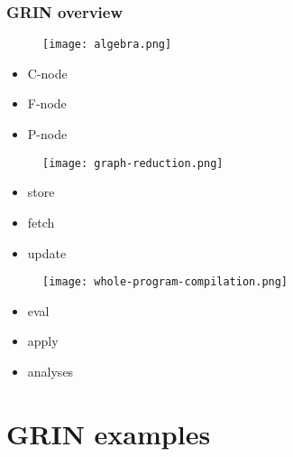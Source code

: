 \documentclass[bigger,aspectratio=169]{beamer}
\begin{document}
\begin{frame}[fragile]
\frametitle{GRIN overview}
\begin{center}

	\begin{minipage}{0.30\textwidth}
		\vspace{1cm}
		\begin{figure}
			\texttt{[image: algebra.png]}
		\end{figure}
		\vspace{0.3cm}
		\begin{itemize}
			\item C-node
			\item F-node
			\item P-node
		\end{itemize}
	\end{minipage}
	\hfill
	\begin{minipage}{0.30\textwidth}
		\begin{figure}
			\texttt{[image: graph-reduction.png]}
		\end{figure}
		\begin{itemize}
			\item store
			\item fetch
			\item update
		\end{itemize}
	\end{minipage}
	\hfill
	\begin{minipage}{0.30\textwidth}
		\begin{figure}
			\texttt{[image: whole-program-compilation.png]}
		\end{figure}
		\begin{itemize}
			\item eval
			\item apply
			\item analyses
		\end{itemize}
	\end{minipage}

\end{center}
\end{frame}


\section{GRIN examples}
\end{document}
